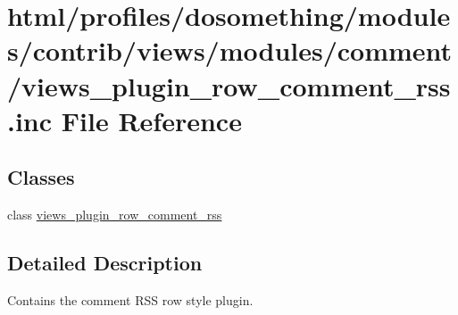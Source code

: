 \hypertarget{views__plugin__row__comment__rss_8inc}{
\section{html/profiles/dosomething/modules/contrib/views/modules/comment/views\_\-plugin\_\-row\_\-comment\_\-rss.inc File Reference}
\label{views__plugin__row__comment__rss_8inc}
}
\subsection*{Classes}
\begin{DoxyCompactItemize}
\item 
class \hyperlink{classviews__plugin__row__comment__rss}{views\_\-plugin\_\-row\_\-comment\_\-rss}
\end{DoxyCompactItemize}


\subsection{Detailed Description}
Contains the comment RSS row style plugin. 